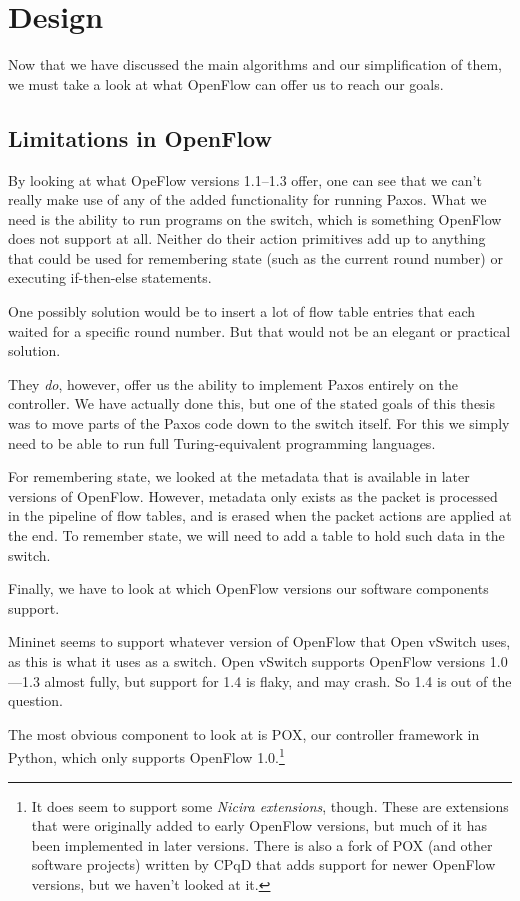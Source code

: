 \chapter{Design}
\label{chapter:design}

Now that we have discussed the main algorithms and our simplification of
them, we must take a look at what OpenFlow can offer us to reach our goals.



\section{Limitations in OpenFlow}

By looking at what OpeFlow versions 1.1--1.3 offer, one can see that we can't really
make use of any of the added functionality for running Paxos.  What we need
is the ability to run programs on the switch, which is something OpenFlow
does not support at all.  Neither do their action primitives add up to
anything that could be used for remembering state (such as the current round
number) or executing if-then-else statements.

One possibly solution would be to insert a lot of flow table entries that
each waited for a specific round number.  But that would not be an elegant
or practical solution.

They \textit{do}, however, offer us the ability to implement Paxos entirely
on the controller.  We have actually done this, but one of the stated goals
of this thesis was to move parts of the Paxos code down to the switch
itself.  For this we simply need to be able to run full Turing-equivalent
programming languages.

For remembering state, we looked at the metadata that is available in later
versions of OpenFlow.  However, metadata only exists as the packet is
processed in the pipeline of flow tables, and is erased when the packet
actions are applied at the end.  To remember state, we will need to add a
table to hold such data in the switch.

Finally, we have to look at which OpenFlow versions our software components
support.

Mininet seems to support whatever version of OpenFlow that Open vSwitch uses,
as this is what it uses as a switch.  Open vSwitch
supports OpenFlow versions 1.0---1.3 almost fully, but support for 1.4 is
flaky, and may crash.  So 1.4
is out of the question.

The most obvious component to look at is POX, our controller framework in
Python, which only supports OpenFlow 1.0.\footnote{It does seem to support
some \textit{Nicira extensions}, though.  These are
extensions that were originally added to early OpenFlow versions, but
much of it has been implemented in later versions.  There is also a fork
of POX (and other software projects) written by CPqD that adds support
for newer OpenFlow versions, but we haven't looked at it.}

